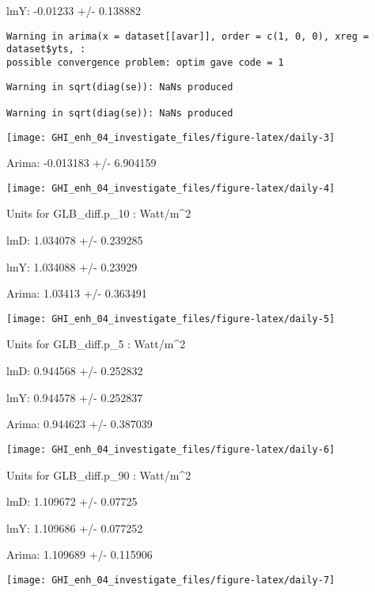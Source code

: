 \documentclass[
  10pt,
  a4paper,oneside]{article}
\begin{document}
lmY: -0.01233 +/- 0.138882

\begin{verbatim}
Warning in arima(x = dataset[[avar]], order = c(1, 0, 0), xreg = dataset$yts, :
possible convergence problem: optim gave code = 1
\end{verbatim}

\begin{verbatim}
Warning in sqrt(diag(se)): NaNs produced

Warning in sqrt(diag(se)): NaNs produced
\end{verbatim}

\begin{center}\texttt{[image: GHI\_enh\_04\_investigate\_files/figure-latex/daily-3]} \end{center}

Arima: -0.013183 +/- 6.904159

\begin{center}\texttt{[image: GHI\_enh\_04\_investigate\_files/figure-latex/daily-4]} \end{center}

Units for GLB\_diff.p\_10 : Watt/m\^{}2

lmD: 1.034078 +/- 0.239285

lmY: 1.034088 +/- 0.23929

Arima: 1.03413 +/- 0.363491

\begin{center}\texttt{[image: GHI\_enh\_04\_investigate\_files/figure-latex/daily-5]} \end{center}

Units for GLB\_diff.p\_5 : Watt/m\^{}2

lmD: 0.944568 +/- 0.252832

lmY: 0.944578 +/- 0.252837

Arima: 0.944623 +/- 0.387039

\begin{center}\texttt{[image: GHI\_enh\_04\_investigate\_files/figure-latex/daily-6]} \end{center}

Units for GLB\_diff.p\_90 : Watt/m\^{}2

lmD: 1.109672 +/- 0.07725

lmY: 1.109686 +/- 0.077252

Arima: 1.109689 +/- 0.115906

\begin{center}\texttt{[image: GHI\_enh\_04\_investigate\_files/figure-latex/daily-7]} \end{center}
\end{document}
